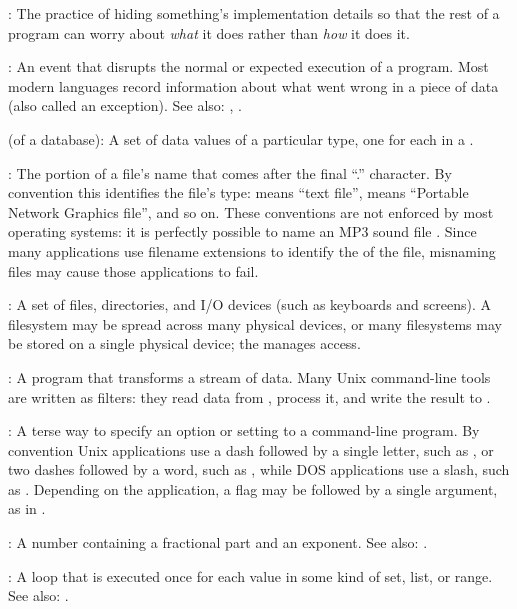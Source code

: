 :
The practice of hiding something's
implementation details so that the rest of a program can worry about
\emph{what} it does rather than \emph{how} it does it.

:
An event that disrupts the normal or expected execution of a program.
Most modern languages record information about what went wrong
in a piece of data (also called an exception).
See also: , .

 (of a database):
A set of data values of a particular
type, one for each  in a
.

:
The portion of a file's name that comes
after the final ``.'' character. By convention this identifies the
file's type:  means ``text file'',  means
``Portable Network Graphics file'', and so on. These conventions are not
enforced by most operating systems: it is perfectly possible to name an
MP3 sound file . Since many applications use
filename extensions to identify the  of
the file, misnaming files may cause those applications to fail.

:
A set of files, directories, and I/O devices (such
as keyboards and screens). A filesystem may be spread across many
physical devices, or many filesystems may be stored on a single physical
device; the  manages
access.

:
A program that transforms a stream of data. Many Unix
command-line tools are written as filters: they read data from
, process it, and write the
result to .

:
A terse way to specify an option or setting to a
command-line program. By convention Unix applications use a dash
followed by a single letter, such as , or two dashes followed
by a word, such as , while DOS applications use a
slash, such as . Depending on the application, a flag may be
followed by a single argument, as in .

:
A number containing a fractional
part and an exponent. See also: .

:
A loop that is executed once for each value in some
kind of set, list, or range. See also: .

